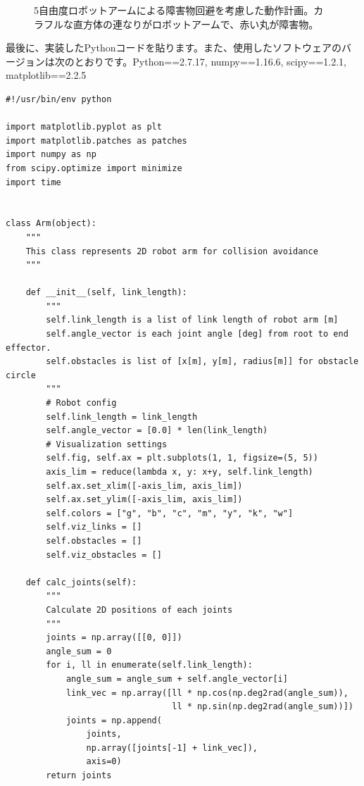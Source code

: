 \begin{figure}[htbp]
\begin{minipage}[!h]{0.32\columnwidth}
\begin{center}
    \end{center}
  \end{minipage}
  \caption{5自由度ロボットアームによる障害物回避を考慮した動作計画。カラフルな直方体の連なりがロボットアームで、赤い丸が障害物。}
  \label{figure:5dof}
\end{figure}

最後に、実装したPythonコードを貼ります。また、使用したソフトウェアのバージョンは次のとおりです。Python==2.7.17, numpy==1.16.6, scipy==1.2.1, matplotlib==2.2.5
\\

\fontsize{8pt}{8pt}\selectfont
\begin{verbatim}
#!/usr/bin/env python

import matplotlib.pyplot as plt
import matplotlib.patches as patches
import numpy as np
from scipy.optimize import minimize
import time


class Arm(object):
    """
    This class represents 2D robot arm for collision avoidance
    """

    def __init__(self, link_length):
        """
        self.link_length is a list of link length of robot arm [m]
        self.angle_vector is each joint angle [deg] from root to end effector.
        self.obstacles is list of [x[m], y[m], radius[m]] for obstacle circle
        """
        # Robot config
        self.link_length = link_length
        self.angle_vector = [0.0] * len(link_length)
        # Visualization settings
        self.fig, self.ax = plt.subplots(1, 1, figsize=(5, 5))
        axis_lim = reduce(lambda x, y: x+y, self.link_length)
        self.ax.set_xlim([-axis_lim, axis_lim])
        self.ax.set_ylim([-axis_lim, axis_lim])
        self.colors = ["g", "b", "c", "m", "y", "k", "w"]
        self.viz_links = []
        self.obstacles = []
        self.viz_obstacles = []

    def calc_joints(self):
        """
        Calculate 2D positions of each joints
        """
        joints = np.array([[0, 0]])
        angle_sum = 0
        for i, ll in enumerate(self.link_length):
            angle_sum = angle_sum + self.angle_vector[i]
            link_vec = np.array([ll * np.cos(np.deg2rad(angle_sum)),
                                 ll * np.sin(np.deg2rad(angle_sum))])
            joints = np.append(
                joints,
                np.array([joints[-1] + link_vec]),
                axis=0)
        return joints


\end{verbatim}
